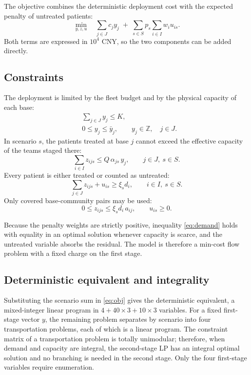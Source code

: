 \documentclass{apmcmthesis}
\begin{document}
The objective combines the deterministic deployment cost with the expected penalty of untreated patients:
\begin{equation}
\min_{y,z,u}\quad \sum_{j\in J} c_j y_j \;+\; \sum_{s\in S} p_s \sum_{i\in I} w_i u_{is}.
\label{eq:obj}
\end{equation}
Both terms are expressed in $10^{4}$ CNY, so the two components can be added directly.

\subsection{Constraints}

The deployment is limited by the fleet budget and by the physical capacity of each base:
\begin{align}
&\sum_{j\in J} y_j \le K, \label{eq:fleet}\\
&0 \le y_j \le \bar y_j, \qquad y_j \in \mathbb{Z}, \quad j\in J. \label{eq:cap}
\end{align}
In scenario $s$, the patients treated at base $j$ cannot exceed the effective capacity of the teams staged there:
\begin{equation}
\sum_{i\in I} z_{ijs} \le Q\,\alpha_{js}\,y_j, \qquad j\in J,\ s\in S.
\label{eq:basecap}
\end{equation}
Every patient is either treated or counted as untreated:
\begin{equation}
\sum_{j\in J} z_{ijs} + u_{is} \ge \xi_s d_i, \qquad i\in I,\ s\in S.
\label{eq:demand}
\end{equation}
Only covered base-community pairs may be used:
\begin{equation}
0 \le z_{ijs} \le \xi_s d_i\, a_{ij}, \qquad u_{is}\ge 0.
\label{eq:cover}
\end{equation}

Because the penalty weights are strictly positive, inequality \eqref{eq:demand} holds with equality in an optimal solution whenever capacity is scarce, and the untreated variable absorbs the residual. The model is therefore a min-cost flow problem with a fixed charge on the first stage.

\subsection{Deterministic equivalent and integrality}

Substituting the scenario sum in \eqref{eq:obj} gives the deterministic equivalent, a mixed-integer linear program in $4+40\times3+10\times3$ variables. For a fixed first-stage vector $y$, the remaining problem separates by scenario into four transportation problems, each of which is a linear program. The constraint matrix of a transportation problem is totally unimodular; therefore, when demand and capacity are integral, the second-stage LP has an integral optimal solution and no branching is needed in the second stage. Only the four first-stage variables require enumeration.
\end{document}
